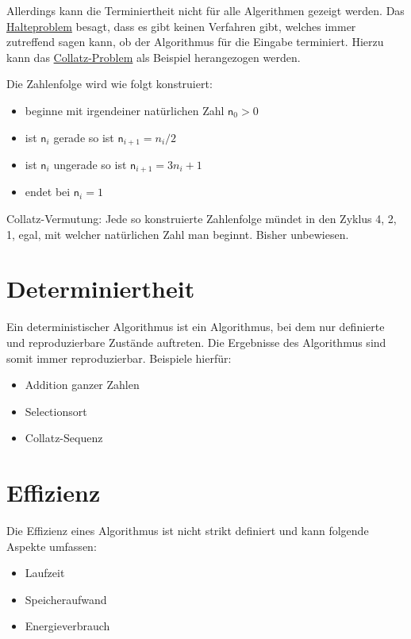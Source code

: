 \documentclass[
  letterpaper,
  DIV=11,
  numbers=noendperiod]{scrreprt}
\providecommand{\tightlist}{%
  \setlength{\itemsep}{0pt}\setlength{\parskip}{0pt}}\usepackage{longtable,booktabs,array}
\begin{document}
Allerdings kann die Terminiertheit nicht für alle Algerithmen gezeigt
werden. Das
\href{https://de.wikipedia.org/wiki/Halteproblem}{Halteproblem} besagt,
dass es gibt keinen Verfahren gibt, welches immer zutreffend sagen kann,
ob der Algorithmus für die Eingabe terminiert. Hierzu kann das
\href{https://de.wikipedia.org/wiki/Collatz-Problem}{Collatz-Problem}
als Beispiel herangezogen werden.

Die Zahlenfolge wird wie folgt konstruiert:

\begin{itemize}
\tightlist
\item
  beginne mit irgendeiner natürlichen Zahl \(\mathsf n_0 > 0\)
\item
  ist \(\mathsf n_i\) gerade so ist \(\mathsf n_{i+1} = n_i/2\)
\item
  ist \(\mathsf n_i\) ungerade so ist \(\mathsf n_{i+1} = 3n_i + 1\)
\item
  endet bei \(\mathsf n_i = 1\)
\end{itemize}

Collatz-Vermutung: Jede so konstruierte Zahlenfolge mündet in den Zyklus
4, 2, 1, egal, mit welcher natürlichen Zahl man beginnt. Bisher
unbewiesen.

\section{Determiniertheit}\label{determiniertheit}

Ein deterministischer Algorithmus ist ein Algorithmus, bei dem nur
definierte und reproduzierbare Zustände auftreten. Die Ergebnisse des
Algorithmus sind somit immer reproduzierbar. Beispiele hierfür:

\begin{itemize}
\tightlist
\item
  Addition ganzer Zahlen
\item
  Selectionsort
\item
  Collatz-Sequenz
\end{itemize}

\section{Effizienz}\label{effizienz}

Die Effizienz eines Algorithmus ist nicht strikt definiert und kann
folgende Aspekte umfassen:

\begin{itemize}
\tightlist
\item
  Laufzeit
\item
  Speicheraufwand
\item
  Energieverbrauch
\end{itemize}
\end{document}
